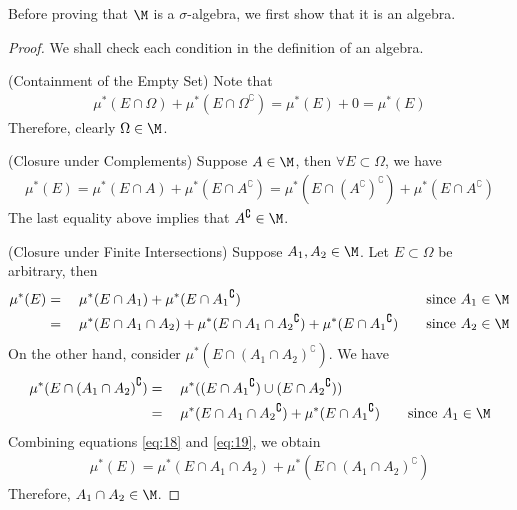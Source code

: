 \documentclass[thmcnt=section, 12pt]{elegantbook}
\begin{document}
\par Before proving that $ \M $ is a $ \sigma $-algebra, we first show that it is an algebra.
\begin{proof}
    We shall check each condition in the definition of an algebra.

    \par (Containment of the Empty Set) Note that 
    \begin{align*}
        \mu^\ast(E \cap \Omega) + \mu^\ast(E \cap \Omega^\complement) = \mu^\ast(E) + 0 = \mu^\ast(E)
    \end{align*}
    Therefore, clearly $ \Omega \in \M $.

    \par (Closure under Complements) Suppose $ A \in \M $, then $ \forall E \subset \Omega $, we have
    \begin{align*}
        \mu^\ast(E) = \mu^\ast(E \cap A) + \mu^\ast(E \cap A^\complement) = \mu^\ast(E \cap (A^\complement)^\complement) + \mu^\ast(E \cap A^\complement)
    \end{align*}
    The last equality above implies that $ A^\complement \in \M $.
    
    \par (Closure under Finite Intersections) Suppose $ A_1, A_2 \in \M $. Let $ E \subset \Omega $ be arbitrary, then 
    \begin{alignat}{3}
        \mu^\ast(E)
        &=& \; & \mu^\ast(E \cap A_1) + \mu^\ast(E \cap {A_1}^\complement) &\quad&\text{since $ A_1 \in \M $} \nonumber\\
        &=& \; & \mu^\ast(E \cap A_1 \cap A_2) + \mu^\ast(E \cap A_1 \cap {A_2}^\complement) + \mu^\ast(E \cap {A_1}^\complement) &\quad&\text{since $ A_2 \in \M $} \label{eq:18}
    \end{alignat}
    On the other hand, consider $ \mu^\ast(E \cap {(A_1 \cap A_2)}^\complement) $. We have 
    \begin{alignat}{3}
        \mu^\ast(E \cap {(A_1 \cap A_2)}^\complement)
        &=& \; & \mu^\ast((E \cap {A_1}^\complement) \cup (E \cap {A_2}^\complement)) &\quad& \nonumber\\
        &=& \; & \mu^\ast(E \cap A_1 \cap {A_2}^\complement) + \mu^\ast(E \cap {A_1}^\complement) &\quad&\text{since $ A_1 \in \M $} \label{eq:19}
    \end{alignat}
    Combining equations \eqref{eq:18} and \eqref{eq:19}, we obtain
    \begin{align*}
        \mu^\ast(E) = \mu^\ast(E \cap A_1 \cap A_2) + \mu^\ast(E \cap {(A_1 \cap A_2)}^\complement)
    \end{align*}
    Therefore, $ A_1 \cap A_2 \in \M $.

\end{proof}
\end{document}
